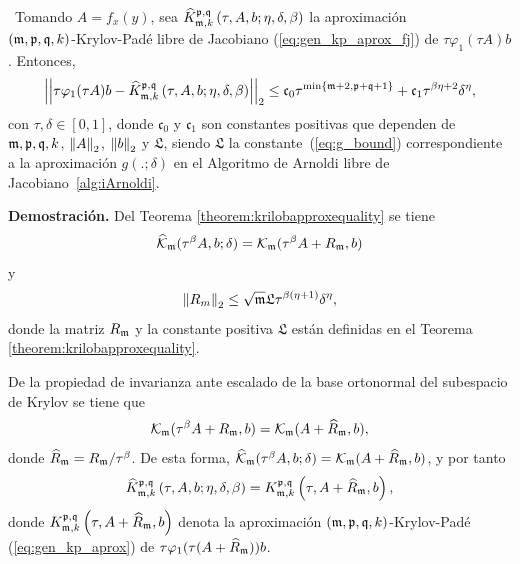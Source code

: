 \begin{theorem}\label{theorem:Krylov-fj-bound}
\cite{naranjo2023jacobian}~Tomando $A=f_x(y)$, sea $\widehat{K}_{\mathfrak{m},k}^{\mathfrak{p},\mathfrak{q}}\left(\tau, A , b ; \eta, \delta, \beta \right)$ la aproximación \\
	$(\mathfrak{m} , \mathfrak{p} ,\mathfrak{q} , k)$-Krylov-Padé libre de Jacobiano (\ref{eq:gen_kp_aprox_fj}) de $\tau \varphi_1(\tau A)b$. Entonces,
	\begin{equation}
		\left\lvert\left\lvert  \tau \varphi_1(\tau A)b -
		\widehat{K}_{\mf,k}^{\pf,\qf}\left( \tau, A , b ; \eta, \delta, \beta \right)\right\rvert\right\rvert_2%
		\leq \mathfrak{c}_0 \tau^{\min\{\mf+2,\pf+\qf+1\}} + \mathfrak{c}_1 \tau^{\beta\eta+2}\delta^{\eta},
	\end{equation}
	con $\tau,\delta \in [0,1]$, donde $\mathfrak{c}_0$ y $\mathfrak{c}_1$ son constantes positivas que dependen de $\mathfrak{m},\mathfrak{p},\mathfrak{q},k$, $\left\lVert A \right\rVert_2$, $\left\lVert b \right\rVert_2$ y $\mathfrak{L}$, siendo $\mathfrak{L}$ la constante~(\ref{eq:g_bound}) correspondiente a la aproximación $g(.;\delta)$ en el Algoritmo de Arnoldi libre de Jacobiano~\ref{alg:iArnoldi}.
\end{theorem}
\textbf{Demostración.} Del Teorema \ref{theorem:krilobapproxequality} se tiene
\[ \widehat{\mathcal{K}}_{\mathfrak{m}}(\tau^\beta A,b;\delta)=\mathcal{K}_{\mathfrak{m}}(\tau^\beta A+R_{\mathfrak{m}},b) \]
y
\begin{equation}
	\left\lVert R_m \right\rVert_2\leq \sqrt{\mathfrak{m}} \mathfrak{L} \tau^{\beta(\eta+1)}\delta^{\eta},  \label{eq:fjbound3}
\end{equation}
donde la matriz $R_{\mathfrak{m}}$ y la constante positiva $\mathfrak{L}$ están definidas en el Teorema \ref{theorem:krilobapproxequality}.

De la propiedad de invarianza ante escalado de la base ortonormal del subespacio de Krylov se tiene que
\[ \mathcal{K}_{\mathfrak{m}}(\tau^\beta A+R_{\mathfrak{m}},b) = \mathcal{K}_{\mathfrak{m}}(A+\widehat{R}_{\mathfrak{m}},b), \]
donde $\widehat{R}_{\mathfrak{m}} = R_{\mathfrak{m}}/\tau^\beta$. De esta forma, $\widehat{\mathcal{K}}_{\mathfrak{m}}(\tau^\beta A,b;\delta)=\mathcal{K}_{\mathfrak{m}}(A+\widehat{R}_{\mathfrak{m}},b)$, y por tanto
\begin{equation}
	\widehat{K}_{\mathfrak{m},k}^{\mathfrak{p},\mathfrak{q}}\left( \tau, A , b; \eta, \delta, \beta \right) = K_{\mathfrak{m},k}^{\mathfrak{p},\mathfrak{q}}\left( \tau, A+\widehat{R}_{\mathfrak{m}} , b \right), \label{identidad}
\end{equation}
donde $K_{\mathfrak{m},k}^{\mathfrak{p},\mathfrak{q}}\left( \tau, A+\widehat{R}_{\mathfrak{m}} , b \right)$ denota la aproximación $(\mathfrak{m} , \mathfrak{p} ,\mathfrak{q} , k)$-Krylov-Padé (\ref{eq:gen_kp_aprox}) de $\tau \varphi_1(\tau (A+\widehat{R}_{\mathfrak{m}}))b$.

